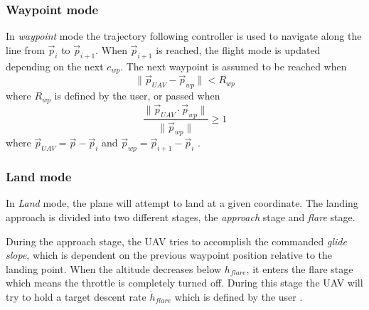\subsubsection{Waypoint mode}
In \textit{waypoint} mode the trajectory following controller is used
to navigate along the line from $\vec{p}_i$ to $\vec{p}_{i+1}$. When $\vec{p}_{i+1}$ is reached, the flight mode
is updated depending on the next $c_{wp}$. The next waypoint is assumed to be reached when
\begin{equation}
    \|\vec{p}_{UAV}-\vec{p}_{wp}\| < R_{wp}
\end{equation}
where $R_{wp}$ is defined by the user, or passed when
\begin{equation}
    \frac{\|\vec{p}_{UAV}\cdot \vec{p}_{wp}\|}{\|\vec{p}_{wp}\|}
     \geq 1
\end{equation}
where $\vec{p}_{UAV}=\vec{p}-\vec{p}_i$ and $\vec{p}_{wp}=\vec{p}_{i+1}-\vec{p}_i$ \cite{ardupilot_auto}.
\subsubsection{Land mode}
In \textit{Land} mode, the plane will attempt to land at a given coordinate. The landing approach 
is divided into two different stages, the \textit{approach} stage and \textit{flare} stage.

During the approach stage, the UAV tries to accomplish the commanded \textit{glide slope}, which is
dependent on the previous waypoint position relative to the landing point. When the altitude decreases
below $h_{flare}$, it enters the flare stage which means the throttle is completely turned off. 
During this stage the UAV will try to hold a target descent rate $\dot{h}_{flare}$ which is
defined by the user \cite{ardupilot_land}.